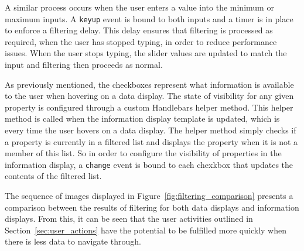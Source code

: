 {	A similar process occurs when the user enters a value into the minimum or maximum inputs. A \texttt{keyup} event is bound to both inputs and a timer is in place to enforce a filtering delay. This delay ensures that filtering is processed as required, when the user has stopped typing, in order to reduce performance issues. When the user stops typing, the slider values are updated to match the input and filtering then proceeds as normal.

	As previously mentioned, the checkboxes represent what information is available to the user when hovering on a data display. The state of visibility for any given property is configured through a custom Handlebars helper method. This helper method is called when the information display template is updated, which is every time the user hovers on a data display. The helper method simply checks if a property is currently in a filtered list and displays the property when it is not a member of this list. So in order to configure the visibility of properties in the information display, a \texttt{change} event is bound to each chexkbox that updates the contents of the filtered list.

	The sequence of images displayed in Figure~\ref{fig:filtering_comparison} presents a comparison between the results of filtering for both data displays and information displays. From this, it can be seen that the user activities outlined in Section~\ref{sec:user_actions} have the potential to be fulfilled more quickly when there is less data to navigate through.

	

}

